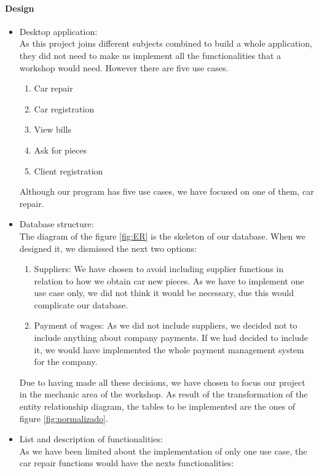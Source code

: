 \documentclass{article}
\begin{document}
\paragraph{Design}
\begin{itemize}
  \item Desktop application: \\
  As this project joins different subjects combined to build a whole application, they did not need to make us implement all the functionalities that a workshop would need. However there are five use cases.
  \begin{enumerate}
    \item Car repair
    \item Car registration
    \item View bills
    \item Ask for pieces
    \item Client registration
  \end{enumerate}
  Although our program has five use cases, we have focused on one of them, car repair.
  \item Database structure:\\
  The diagram of the figure \ref{fig:ER} is the skeleton of our database. When we designed it, we dismissed the next two options:\\
  \begin{enumerate}
    \item Suppliers: We have chosen to avoid including supplier functions in relation to how we obtain car new pieces. As we have to implement one use case only, we did not think it would be necessary, due this would complicate our database.
    \item Payment of wages: As we did not include suppliers, we decided not to include anything about company payments. If we had decided to include it, we would have implemented the whole payment management system for the company.
  \end{enumerate}
  Due to having made all these decisions, we have chosen to focus our project in the mechanic area of the workshop. As result of the transformation of the entity relationship diagram, the tables to be implemented are the ones of figure \ref{fig:normalizado}.
  \item List and description of functionalities:\\
  As we have been limited about the implementation of only one use case, the car repair functions would have the nexts functionalities:
  \begin{enumerate}

\end{enumerate}
\end{itemize}
\end{document}

